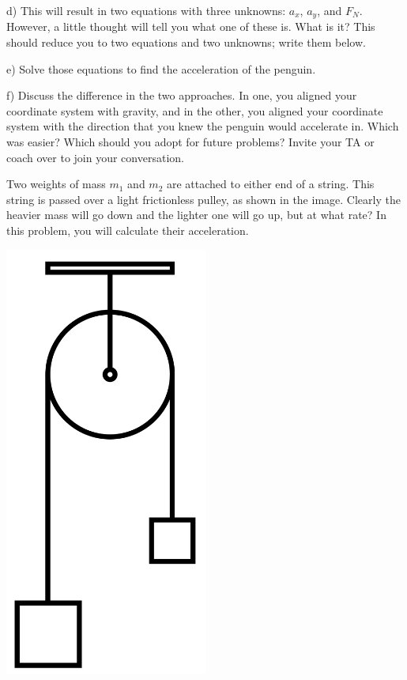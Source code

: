 \documentclass[12pt]{article}
\begin{document}
\vspace{3in}
\newpage

d) This will result in two equations with three unknowns: $a_x$, $a_y$, and $F_N$. However, a little thought will
tell you what one of these is. What is it? This should reduce you to two equations and two unknowns; write them below.

\vspace{2in}

e) Solve those equations to find the acceleration of the penguin.

\vspace{2in}

f) Discuss the difference in the two approaches. In one, you aligned your coordinate system with gravity, and in the other, you aligned your coordinate system with the direction that you knew the penguin would accelerate in. Which was easier? Which 
should you adopt for future problems? Invite your TA or coach over to join your conversation.

\newpage
\begin{minipage}{0.7\textwidth}
Two weights of mass $m_1$ and $m_2$ are attached to either end of a string. This string is passed over a light frictionless pulley, as shown in the image.
Clearly the heavier mass will go down and the lighter one will go up, but at what rate? In this problem, you will calculate their acceleration.
\end{minipage} \hfill
\begin{minipage}{0.3\textwidth}
\begin{center}\includegraphics[width=0.5\textwidth]{atwood.png}
\end{center}
\end{minipage} \hfill
\end{document}
